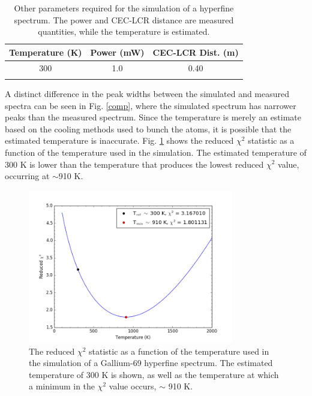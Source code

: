 \begin{table}[h]
\centering
\begin{tabular}{c c c}\hline
Temperature (K)&Power (mW)&CEC-LCR Dist. (m)\\ \hline
300 & 1.0 & 0.40\\ \hline \\
\end{tabular}
\caption[Other parameters required for the simulation of a hyperfine spectrum.]{\small Other parameters required for the simulation of a hyperfine spectrum. The power and CEC-LCR distance are measured quantities, while the temperature is estimated.}
\label{othercoeff}
\end{table}

A distinct difference in the peak widths between the simulated and measured spectra can be seen in Fig. \ref{comp}, where the simulated spectrum has narrower peaks than the measured spectrum. Since the temperature is merely an estimate based on the cooling methods used to bunch the atoms, it is possible that the estimated temperature is inaccurate. Fig. \ref{chi_temp} shows the reduced $\chi^2$ statistic as a function of the temperature used in the simulation. The estimated temperature of 300 K is lower than the temperature that produces the lowest reduced $\chi^2$ value, occurring at $\sim$910 K.
\begin{figure}[h]
\centering
\includegraphics[width=0.8\textwidth]{Graphics/temp_chi.png}
\caption[Reduced $\chi^2$ statistic as a function of the temperature used in the simulation of a Gallium-69 hyperfine spectrum.]{\small The reduced $\chi^2$ statistic as a function of the temperature used in the simulation of a Gallium-69 hyperfine spectrum. The estimated temperature of 300 K is shown, as well as the temperature at which a minimum in the $\chi^2$ value occurs, $\sim$ 910 K.}
\label{chi_temp}
\end{figure}
